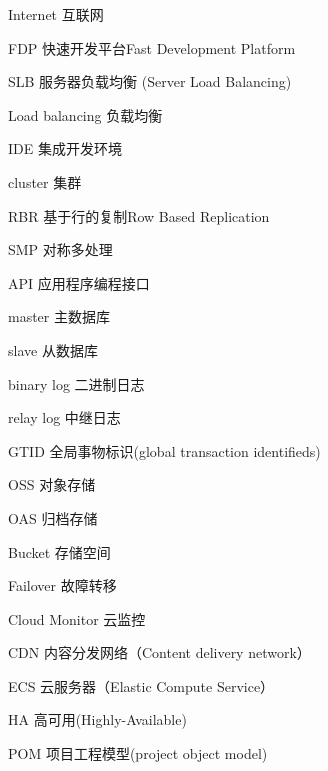 \begin{denotation}[3cm]
\item[Internet] 互联网
\item[FDP] 快速开发平台Fast Development Platform
\item[SLB] 服务器负载均衡 (Server Load Balancing)
\item[Load balancing] 负载均衡
\item[IDE] 集成开发环境
\item[cluster] 集群
\item[RBR] 基于行的复制Row Based Replication
\item[SMP] 对称多处理
\item[API] 应用程序编程接口
\item[master] 主数据库
\item[slave] 从数据库
\item[binary log] 二进制日志
\item[relay log] 中继日志
\item[GTID] 全局事物标识(global transaction identifieds)
\item[OSS] 对象存储
\item[OAS] 归档存储
\item[Bucket] 存储空间
\item[Failover] 故障转移
\item[Cloud Monitor] 云监控
\item[CDN] 内容分发网络（Content delivery network）
\item[ECS] 云服务器（Elastic Compute Service）
\item[HA] 高可用(Highly-Available)
\item[POM] 项目工程模型(project object model)
\end{denotation}
